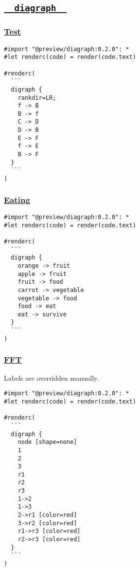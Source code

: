 \pandocbounded{}

\subsection{\texorpdfstring{\hyperref[diagraph]{\texttt{\ }{\texttt{\ diagraph\ }}\texttt{\ }}}{  diagraph  }}\label{diagraph}

\subsubsection{\texorpdfstring{\hyperref[test]{Test}}{Test}}\label{test}

\begin{verbatim}
#import "@preview/diagraph:0.2.0": *
#let renderc(code) = render(code.text)

#renderc(
  ```
  digraph {
    rankdir=LR;
    f -> B
    B -> f
    C -> D
    D -> B
    E -> F
    f -> E
    B -> F
  }
  ```
)
\end{verbatim}

\pandocbounded{}

\subsubsection{\texorpdfstring{\hyperref[eating]{Eating}}{Eating}}\label{eating}

\begin{verbatim}
#import "@preview/diagraph:0.2.0": *
#let renderc(code) = render(code.text)

#renderc(
  ```
  digraph {
    orange -> fruit
    apple -> fruit
    fruit -> food
    carrot -> vegetable
    vegetable -> food
    food -> eat
    eat -> survive
  }
  ```
)
\end{verbatim}

\pandocbounded{}

\subsubsection{\texorpdfstring{\hyperref[fft]{FFT}}{FFT}}\label{fft}

Labels are overridden manually.

\begin{verbatim}
#import "@preview/diagraph:0.2.0": *
#let renderc(code) = render(code.text)

#renderc(
  ```
  digraph {
    node [shape=none]
    1
    2
    3
    r1
    r2
    r3
    1->2
    1->3
    2->r1 [color=red]
    3->r2 [color=red]
    r1->r3 [color=red]
    r2->r3 [color=red]
  }
  ```
)
\end{verbatim}

